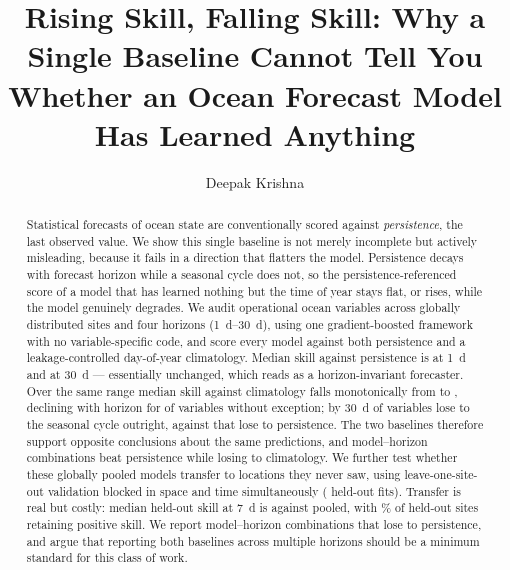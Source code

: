 \documentclass[runningheads]{llncs}
\begin{document}
\title{Rising Skill, Falling Skill: Why a Single Baseline Cannot Tell You
Whether an Ocean Forecast Model Has Learned Anything}


\author{Deepak Krishna}

\maketitle

\begin{abstract}
Statistical forecasts of ocean state are conventionally scored against
\emph{persistence}, the last observed value. We show this single baseline is
not merely incomplete but actively misleading, because it fails in a direction
that flatters the model. Persistence decays with forecast horizon while a
seasonal cycle does not, so the persistence-referenced score of a model that
has learned nothing but the time of year stays flat, or rises, while the model
genuinely degrades. We audit \NVars{} operational ocean variables across
\NSites{} globally distributed sites and four horizons
(\SIrange{1}{30}{\day}), using one gradient-boosted framework with no
variable-specific code, and score every model against both persistence and a
leakage-controlled day-of-year climatology. Median skill against persistence is
\MedSkillPOne{} at \SI{1}{\day} and \MedSkillPThirty{} at \SI{30}{\day}
--- essentially unchanged, which reads as a horizon-invariant forecaster. Over
the same range median skill against climatology falls monotonically from
\MedSkillCOne{} to \MedSkillCThirty{}, declining with horizon for
\NFallingClim{} of \NVars{} variables without exception; by \SI{30}{\day}
\NLoseClimThirty{} of \NVars{} variables lose to the seasonal cycle outright,
against \NLosePersThirty{} that lose to persistence. The two baselines
therefore support opposite conclusions about the same predictions, and
\NLoseToClim{} model--horizon combinations beat persistence while losing to
climatology. We further
test whether these globally pooled models transfer to locations they never saw,
using leave-one-site-out validation blocked in space and time simultaneously
(\NLosoFits{} held-out fits). Transfer is real but costly: median held-out
skill at \SI{7}{\day} is \MedLosoSeven{} against \MedPooledSeven{} pooled, with
\LosoPositiveShare{}\% of held-out sites retaining positive skill. We report
\NLoseToPers{} model--horizon combinations that lose to persistence, and argue
that reporting both baselines across multiple horizons should be a minimum
standard for this class of work.

\end{abstract}
\end{document}
